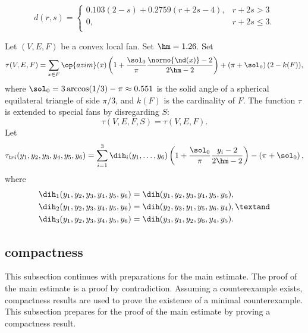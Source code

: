 \begin{definition}[d]
\[ d(r,s) = \begin{cases}
0.103 (2-s) + 0.2759 (r+2s-4), & r + 2s > 3\\
0, & r + 2s \le 3.\\
\end{cases}\] 
\end{definition}

\begin{definition}\label{def:tau}
Let $(V,E,F)$ be a convex local fan.  Set $\hm = 1.26$.  Set
\[ 
  \tau(V,E,F) =\sum_{x\in F} \op{azim}(x)\left(1 + \dfrac{\sol_0}{\pi}  
    \dfrac{\normo{\nd(x)}-2}{2\hm-2}\right) 
+ \left(\pi+{\sol_0}\right) (2- k(F)),
\] 
where $\sol_0=3\arccos(1/3)-\pi\approx0.551$ is the solid angle of a
spherical equilateral triangle of side $\pi/3$, and $k(F)$ is the
cardinality of $F$.  The function $\tau$ is extended to special fans by
disregarding $S$:
\[ 
\tau(V,E,F,S) = \tau(V,E,F).
\] 
Let 
\[ 
  \tau_{tri}(y_1,y_2,y_3,y_4,y_5,y_6) =
  \sum_{i=1}^3 \dih_i(y_1,\ldots,y_6)
\left(1 + \dfrac{\sol_0}{\pi}  \dfrac{y_i -2}{2\hm-2}\right) 
- \left(\pi+{\sol_0}\right),
\] 
where
\begin{align*}
\dih_1(y_1,y_2,y_3,y_4,y_5,y_6) &= \dih(y_1,y_2,y_3,y_4,y_5,y_6),\\
\dih_2(y_1,y_2,y_3,y_4,y_5,y_6) &= \dih(y_2,y_3,y_1,y_5,y_6,y_4),\textand \\
\dih_3(y_1,y_2,y_3,y_4,y_5,y_6) &= \dih(y_3,y_1,y_2,y_6,y_4,y_5).\\
\end{align*}
\end{definition}



\subsection{compactness}

This subsection continues with preparations for the main estimate.
The proof of the main estimate is a proof by contradiction. Assuming a
counterexample exists, compactness results are used to prove the
existence of a minimal counterexample.  This subsection prepares for
the proof of the main estimate by proving a compactness result.

